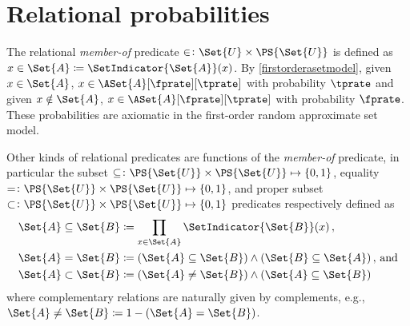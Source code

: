\documentclass[ ../main.tex]{subfiles}
\begin{document}
\section{Relational probabilities}
The relational \emph{member-of} predicate $\in \colon \Set{U} \times \PS{\Set{U}}$ is defined as $x \in \Set{A} \coloneqq \SetIndicator{\Set{A}}(x)$.
By \cref{firstorderasetmodel}, given $x \in \Set{A}$, $x \in \ASet{A}[\fprate][\tprate]$ with probability $\tprate$ and given $x \notin \Set{A}$, $x \in \ASet{A}[\fprate][\tprate]$ with probability $\fprate$.
These probabilities are axiomatic in the first-order random approximate set model.

Other kinds of relational predicates are functions of the \emph{member-of} predicate, in particular the subset $\subseteq \colon \PS{\Set{U}} \times \PS{\Set{U}} \mapsto \{0,1\}$, equality $= \colon \PS{\Set{U}} \times \PS{\Set{U}} \mapsto \{0,1\}$, and
proper subset $\subset \colon \PS{\Set{U}} \times \PS{\Set{U}} \mapsto \{0,1\}$ predicates respectively defined as
\begin{align}
\Set{A} \subseteq \Set{B}	&\coloneqq \prod_{x \in \Set{A}} \SetIndicator{\Set{B}}(x)\,,\\
\Set{A} = \Set{B}			&\coloneqq (\Set{A}\subseteq\Set{B}) \land (\Set{B}\subseteq\Set{A})\,,\,\text{and}\\
\Set{A} \subset \Set{B}		&\coloneqq (\Set{A} \neq \Set{B}) \land (\Set{A} \subseteq \Set{B})
\end{align}
where complementary relations are naturally given by complements, e.g., $\Set{A} \neq \Set{B} \coloneqq 1-(\Set{A} = \Set{B})$.
\end{document}
